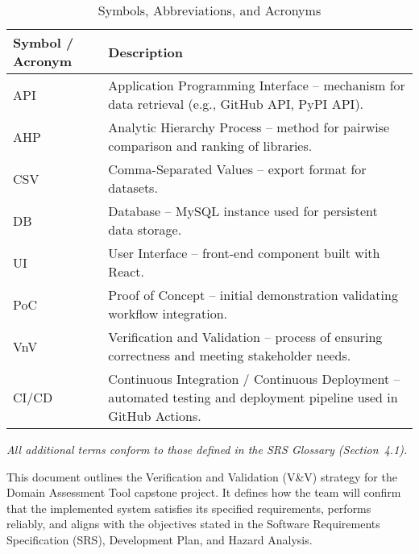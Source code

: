 \documentclass[12pt, titlepage]{article}
\renewcommand{\arraystretch}{1.15}
\begin{document}


\begin{table}[H]
\centering
\caption{Symbols, Abbreviations, and Acronyms}
\setlength{\tabcolsep}{5pt}
\renewcommand{\arraystretch}{1.2}
\footnotesize

\begin{tabularx}{\textwidth}{l X}
\toprule
\textbf{Symbol / Acronym} & \textbf{Description} \\
\midrule
\arrayrulecolor[gray]{0.8}
API & Application Programming Interface – mechanism for data retrieval (e.g., GitHub API, PyPI API). \\
\hline
AHP & Analytic Hierarchy Process – method for pairwise comparison and ranking of libraries. \\
\hline
CSV & Comma-Separated Values – export format for datasets. \\
\hline
DB & Database – MySQL instance used for persistent data storage. \\
\hline
UI & User Interface – front-end component built with React. \\
\hline
PoC & Proof of Concept – initial demonstration validating workflow integration. \\
\hline
VnV & Verification and Validation – process of ensuring correctness and meeting stakeholder needs. \\
\hline
CI/CD & Continuous Integration / Continuous Deployment – automated testing and deployment pipeline used in GitHub Actions. \\
\bottomrule
\end{tabularx}
\end{table}

\noindent\textit{All additional terms conform to those defined in the SRS Glossary (Section~4.1).}
\newpage


This document outlines the Verification and Validation (V\&V) strategy for the
Domain Assessment Tool capstone project. It defines how
the team will confirm that the implemented system satisfies its specified
requirements, performs reliably, and aligns with the objectives stated in the
Software Requirements Specification (SRS), Development Plan, and Hazard
Analysis.
\end{document}
